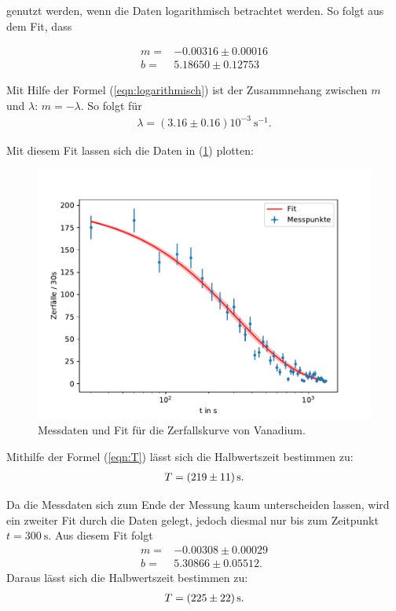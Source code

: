 genutzt werden, wenn die Daten logarithmisch betrachtet werden. So folgt aus dem Fit, dass

\begin{align*}
    m =& -0.00316 \pm 0.00016 \\
    b =& 5.18650 \pm  0.12753
\end{align*}

Mit Hilfe der Formel (\ref{eqn:logarithmisch}) ist der Zusammnehang zwischen $m$ und $\lambda$: $m = -\lambda$.
So folgt für 
\begin{align*}
	\lambda = (3.16 \pm 0.16) 10^{-3} \  \si{\second}^{-1}.
\end{align*}

Mit diesem Fit lassen sich die Daten in (\ref{fig:zerfallskurve3}) plotten:

\begin{figure}[H]
	\centering
	\includegraphics{Daten/Vanadium.pdf}
	\caption{Messdaten und Fit für die Zerfallskurve von Vanadium.}
	\label{fig:zerfallskurve3}
\end{figure}
\noindent

Mithilfe der Formel (\ref{eqn:T}) lässt sich die Halbwertszeit bestimmen zu:
\begin{align*}
	T = \SI{219\pm11}{\second}.
\end{align*}
\noindent

Da die Messdaten sich zum Ende der Messung kaum unterscheiden lassen, wird ein zweiter Fit durch die Daten gelegt, jedoch diesmal nur bis zum Zeitpunkt $t = \SI{300}{\second}$. Aus diesem
Fit folgt 
\begin{align*}
    m =& -0.00308 \pm 0.00029 \\
    b =& 5.30866 \pm  0.05512.
\end{align*}
\noindent
Daraus lässt sich die Halbwertszeit bestimmen zu:
\begin{align*}
	T = \SI{225\pm22}{\second}.
\end{align*}

